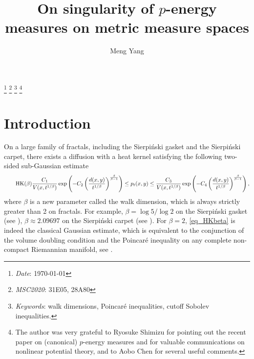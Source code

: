 \documentclass[11pt,a4paper]{article}
\numberwithin{equation}{section}
\theoremstyle{plain}
\theoremstyle{definition}
\renewcommand{\thefootnote}{}
\begin{document}
\title{{On singularity of $p$-energy measures on metric measure spaces}}
\author{Meng Yang}
\date{}

\maketitle


\footnote{\textsl{Date}: \today}
\footnote{\textsl{MSC2020}: 31E05, 28A80}
\footnote{\textsl{Keywords}: walk dimensions, Poincar\'e inequalities, cutoff Sobolev inequalities.}
\footnote{The author was very grateful to Ryosuke Shimizu for pointing out the recent paper \cite{Sas26} on (canonical) $p$-energy measures and for valuable communications on nonlinear potential theory, and to Aobo Chen for several useful comments.}

\renewcommand{\thefootnote}{\arabic{footnote}}
\setcounter{footnote}{0}

\section{Introduction}

On a large family of fractals, including the Sierpi\'nski gasket and the Sierpi\'nski carpet, there exists a diffusion with a heat kernel satisfying the following two-sided sub-Gaussian estimate
\begin{align*}\label{eq_HKbeta}\tag*{$\text{HK}(\beta)$}
\frac{C_1}{V(x,t^{1/\beta})}\exp\left(-C_2\left(\frac{d(x,y)}{t^{1/\beta}}\right)^{\frac{\beta}{\beta-1}}\right)\le p_t(x,y)\le\frac{C_3}{V(x,t^{1/\beta})}\exp\left(-C_4\left(\frac{d(x,y)}{t^{1/\beta}}\right)^{\frac{\beta}{\beta-1}}\right),\nonumber
\end{align*}
where $\beta$ is a new parameter called the walk dimension, which is always strictly greater than 2 on fractals. For example, $\beta=\log5/\log2$ on the Sierpi\'nski gasket (see \cite{BP88,Kig89}), $\beta\approx2.09697$ on the Sierpi\'nski carpet (see \cite{BB89,BB90,BBS90,BB92,KZ92,HKKZ00}). For $\beta=2$, \ref{eq_HKbeta} is indeed the classical Gaussian estimate, which is equivalent to the conjunction of the volume doubling condition and the Poincar\'e inequality on any complete non-compact Riemannian manifold, see \cite{Gri92,Sal92,Sal95}.
\end{document}
